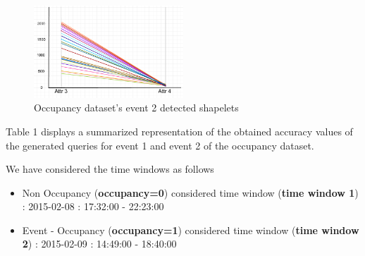 \documentclass[conference]{IEEEtran}  %
\begin{document}
\begin{figure}[h!]
\includegraphics[width=0.5\textwidth]{Occupancy_event2.png}
\caption{Occupancy dataset's event 2 detected shapelets}
\end{figure}

Table 1 displays a summarized representation of the obtained accuracy values of the generated queries for event 1 and event 2 of the occupancy dataset.

We have considered the time windows as follows
\begin{itemize}
\item Non Occupancy (\textbf{occupancy=0}) considered time window (\textbf{time window 1}) : 2015-02-08 : 17:32:00 - 22:23:00
\item Event - Occupancy (\textbf{occupancy=1}) considered time window (\textbf{time window 2}) : 2015-02-09 : 14:49:00 - 18:40:00
\end{itemize}
\end{document}

